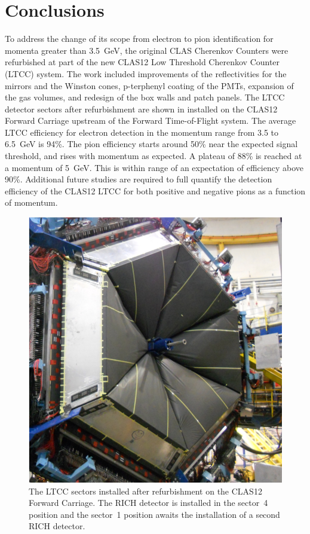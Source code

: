 \section{Conclusions}

To address the change of its scope from electron to pion identification for momenta greater than 3.5~GeV,
the original CLAS Cherenkov Counters were refurbished at part of the new CLAS12 Low Threshold Cherenkov
Counter (LTCC) system. The work included improvements of the reflectivities for the mirrors and the Winston
cones, p-terphenyl coating of the PMTs, expansion of the gas volumes, and redesign of the box walls and patch
panels. The LTCC detector sectors after refurbishment are shown in  installed on the CLAS12
Forward Carriage upstream of the Forward Time-of-Flight system. The average LTCC efficiency for electron
detection in the momentum range from 3.5 to 6.5~GeV is 94\%. The pion efficiency starts around 50\% near
the expected signal threshold, and rises with momentum as expected. A plateau of 88\% is reached at a momentum
of 5~GeV. This is within range of an expectation of efficiency above 90\%. Additional future studies are required
to full quantify the detection efficiency of the CLAS12 LTCC for both positive and negative pions as a function of
momentum.

\begin{figure}
    \centering
    \includegraphics[width=1.0\columnwidth, height=1.1\columnwidth]{img/ltccInstalled.png}
    \caption{The LTCC sectors installed after refurbishment on the CLAS12 Forward Carriage. The RICH detector
    is installed in the sector~4 position and the sector~1 position awaits the installation of a second RICH detector.}
    \label{fig:ltccInstalled}
\end{figure}

